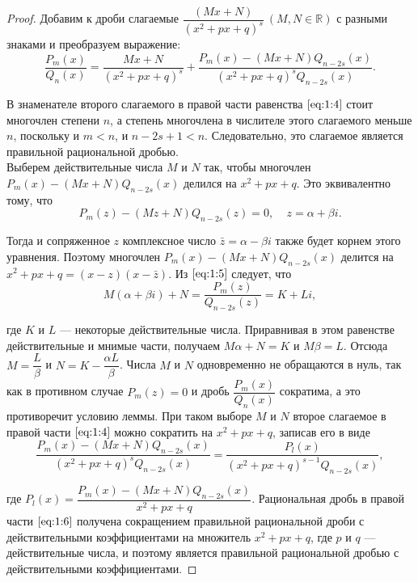 \documentclass[12pt]{report}
\numberwithin{equation}{section}
\begin{document}
\begin{proof}
Добавим к дроби слагаемые $\dfrac{(Mx + N)}{(x^2 + px + q)^s}~(M,N \in \mathbb{R})$ с разными знаками и преобразуем выражение:
\begin{equation}\label{eq:1:4}
\frac{P_m(x)}{Q_n(x)} =\frac{Mx + N}{(x^2 + px + q)^s} + \frac{P_m(x) - (Mx+N)Q_{n-2s}(x)}{(x^2     + px + q)^s Q_{n-2s}(x)}. 
\end{equation}

В знаменателе второго слагаемого в правой части равенства $\eqref{eq:1:4}$ стоит многочлен степени $n$, а степень многочлена в числителе этого слагаемого меньше $n$, поскольку и $m < n$, и $n - 2s + 1 < n$. Следовательно, это слагаемое является правильной рациональной дробью.\\

Выберем действительные числа $M$ и $N$ так, чтобы многочлен $P_m(x) - (Mx + N) Q_{n-2s}(x)$ делился на $x^2 + px + q$. Это эквивалентно тому, что
\begin{equation}\label{eq:1:5}
P_m(z) - (Mz + N) Q_{n-2s}(z) = 0, ~~~~~ z = \alpha + \beta i. 
\end{equation}

Тогда и сопряженное $z$ комплексное число $\bar{z} = \alpha - \beta i$ также будет корнем этого уравнения. Поэтому многочлен $P_m(x) - (Mx + N) Q_{n-2s}(x)$ делится на $x^2 + px + q = (x-z)(x-\bar{z})$. Из $\eqref{eq:1:5}$ следует, что 
\[ M(\alpha + \beta i) + N = \frac{P_m(z)}{Q_{n-2s}(z)} = K + Li,   \]

где $K$ и $L$ --- некоторые действительные числа. Приравнивая в этом равенстве действительные и мнимые части, получаем $M \alpha + N = K$ и $M \beta = L$. Отсюда $M = \dfrac{L}{\beta} $ и $N = K - \dfrac{\alpha L}{\beta}$. Числа $M$ и $N$ одновременно не обращаются в нуль, так как в противном случае $P_m(z) = 0$ и дробь $\dfrac{P_m(x)}{Q_n(x)}$ сократима, а это противоречит условию леммы. При таком выборе $M$ и $N$ второе слагаемое в правой части $\eqref{eq:1:4}$ можно сократить на $x^2 + px + q$, записав его в виде
\begin{equation}\label{eq:1:6}
\frac{P_m(x) - (Mx + N) Q_{n-2s} (x)}{(x^2 + px + q)^s Q_{n-2s}(x)} = \frac{P_l(x)}{(x^2 + px + q)^{s-1} Q_{n-2s}(x)}, 
\end{equation}

где $P_l(x) = \dfrac{P_m(x) - (Mx + N) Q_{n-2s}(x)}{x^2 + px + q}$. Рациональная дробь в правой части $\eqref{eq:1:6}$ получена сокращением правильной рациональной дроби с действительными коэффициентами на множитель $x^2 + px + q$, где $p$ и $q$ --- действительные числа, и поэтому является правильной рациональной дробью с действительными коэффициентами.
\end{proof}
\end{document}
